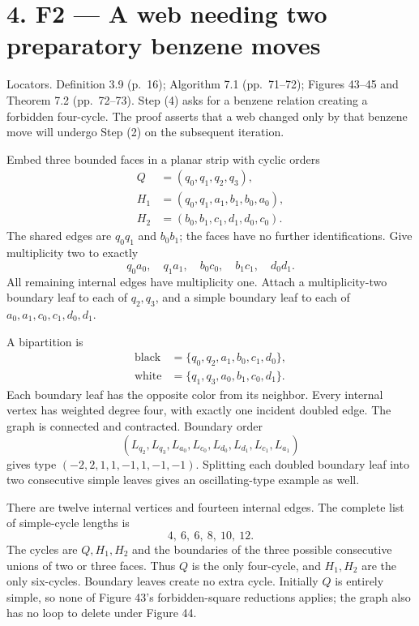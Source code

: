 \documentclass[10pt]{article}
\begin{document}
\section*{4. F2 — A web needing two preparatory benzene moves}
Locators. Definition 3.9 (p. 16); Algorithm 7.1 (pp. 71–72); Figures 43–45 and Theorem 7.2 (pp. 72–73). Step (4) asks for a benzene relation creating a forbidden four-cycle. The proof asserts that a web changed only by that benzene move will undergo Step (2) on the subsequent iteration.\par
Embed three bounded faces in a planar strip with cyclic orders \[\begin{aligned}
Q&=(q_0,q_1,q_2,q_3),\\
H_1&=(q_0,q_1,a_1,b_1,b_0,a_0),\\
H_2&=(b_0,b_1,c_1,d_1,d_0,c_0).
\end{aligned}\] The shared edges are \(q_0q_1\) and \(b_0b_1\); the faces have no further identifications. Give multiplicity two to exactly \[q_0a_0,\quad q_1a_1,\quad b_0c_0,\quad b_1c_1,\quad d_0d_1.\] All remaining internal edges have multiplicity one. Attach a multiplicity-two boundary leaf to each of \(q_2,q_3\), and a simple boundary leaf to each of \(a_0,a_1,c_0,c_1,d_0,d_1\).\par
A bipartition is \[\begin{aligned}
\text{black}&=\{q_0,q_2,a_1,b_0,c_1,d_0\},\\
\text{white}&=\{q_1,q_3,a_0,b_1,c_0,d_1\}.
\end{aligned}\] Each boundary leaf has the opposite color from its neighbor. Every internal vertex has weighted degree four, with exactly one incident doubled edge. The graph is connected and contracted. Boundary order \[(L_{q_2},L_{q_3},L_{a_0},L_{c_0},L_{d_0},L_{d_1},L_{c_1},L_{a_1})\] gives type \((-2,2,1,1,-1,1,-1,-1)\). Splitting each doubled boundary leaf into two consecutive simple leaves gives an oscillating-type example as well.\par
There are twelve internal vertices and fourteen internal edges. The complete list of simple-cycle lengths is \[4,\ 6,\ 6,\ 8,\ 10,\ 12.\] The cycles are \(Q,H_1,H_2\) and the boundaries of the three possible consecutive unions of two or three faces. Thus \(Q\) is the only four-cycle, and \(H_1,H_2\) are the only six-cycles. Boundary leaves create no extra cycle. Initially \(Q\) is entirely simple, so none of Figure 43’s forbidden-square reductions applies; the graph also has no loop to delete under Figure 44.\par
\end{document}

